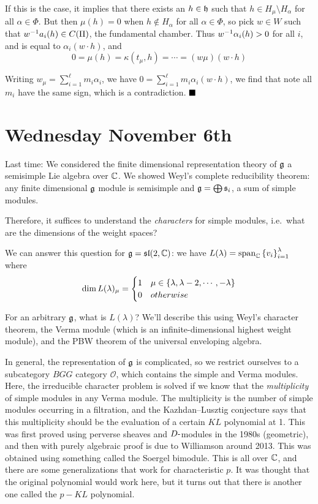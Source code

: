 If this is the case, it implies that there exists an \(h \in {\mathfrak{h}}\)
such that \(h \in H_\mu \setminus H_\alpha\) for all
\(\alpha \in \Phi\). But then \(\mu(h) = 0\) when \(h \not\in H_\alpha\)
for all \(\alpha \in \Phi\), so pick \(w\in W\) such that
\(w^{-1} a_i(h) \in C(\Pi)\), the fundamental chamber. Thus
\(w^{-1} \alpha_i (h) > 0\) for all \(i\), and is equal to
\(\alpha_i(w \cdot h)\), and \[
0 = \mu(h) = \kappa(t_\mu, h) = \cdots = (w\mu)(w \cdot h)
\]

Writing \(w_\mu = \sum_{i=1}^\ell m_i \alpha_i\), we have
\(0 = \sum_{i=1}^\ell m_i \alpha_i(w\cdot h)\), we find that note all
\(m_i\) have the same sign, which is a contradiction. \(\qed\)

\hypertarget{wednesday-november-6th}{%
\section{Wednesday November 6th}\label{wednesday-november-6th}}

Last time: We considered the finite dimensional representation theory of
\({\mathfrak{g}}\) a semisimple Lie algebra over \({\mathbb{C}}\). We showed Weyl's
complete reducibility theorem: any finite dimensional \({\mathfrak{g}}\) module
is semisimple and \({\mathfrak{g}} = \bigoplus \mathfrak{s}_i\), a sum of simple
modules.

Therefore, it suffices to understand the \emph{characters} for simple
modules, i.e.~what are the dimensions of the weight spaces?

We can answer this question for \({\mathfrak{g}} = {\mathfrak{sl}}(2, {\mathbb{C}})\): we have
\(L(\lambda) = \mathrm{span}_{\mathbb{C}} \left\{{v_i}\right\}_{i=1}^\lambda\) where \[
\dim L(\lambda)_\mu = \begin{cases} 1 & \mu \in \left\{{\lambda, \lambda-2, \cdots, -\lambda}\right\} \\ 0 & otherwise \end{cases}
\]

For an arbitrary \({\mathfrak{g}}\), what is \(L(\lambda)\)? We'll describe this
using Weyl's character theorem, the Verma module (which is an
infinite-dimensional highest weight module), and the PBW theorem of the
universal enveloping algebra.

In general, the representation of \({\mathfrak{g}}\) is complicated, so we
restrict ourselves to a subcategory \(BGG\) category \(\mathcal O\),
which contains the simple and Verma modules. Here, the irreducible
character problem is solved if we know that the \emph{multiplicity} of
simple modules in any Verma module. The multiplicity is the number of
simple modules occurring in a filtration, and the Kazhdan--Lusztig
conjecture says that this multiplicity should be the evaluation of a
certain \(KL\) polynomial at 1. This was first proved using perverse
sheaves and \(D{\hbox{-}}\)modules in the 1980s (geometric), and then with
purely algebraic proof is due to Williamson around 2013. This was
obtained using something called the Soergel bimodule. This is all over
\({\mathbb{C}}\), and there are some generalizations that work for characteristic
\(p\). It was thought that the original polynomial would work here, but
it turns out that there is another one called the \(p-KL\) polynomial.

